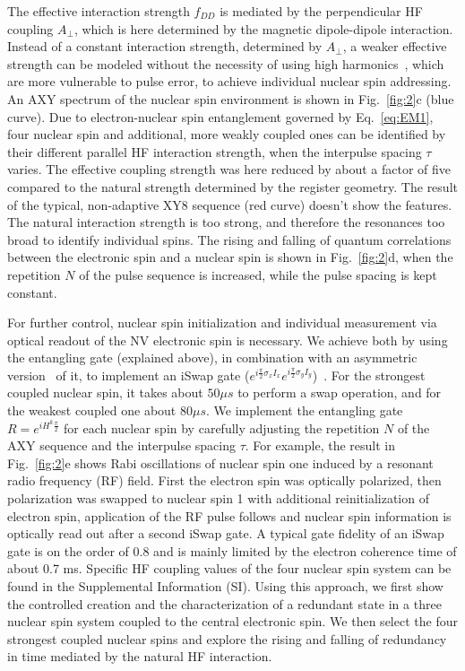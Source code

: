 \documentclass[aps,prl,floatfix,twocolumn,footinbib,superscriptaddress]{revtex4-1}
\begin{document}
The effective interaction strength $f_{DD}$ is mediated by the perpendicular HF coupling $A_\perp$, which is here determined by the magnetic dipole-dipole interaction. Instead of a constant interaction strength, determined by $A_\perp$, a weaker effective strength can be modeled without the necessity of using high harmonics~\cite{Childress281,Tam14}, which are more vulnerable to pulse error, to achieve individual nuclear spin addressing. An AXY spectrum of the nuclear spin environment is shown in Fig.~\ref{fig:2}c (blue curve). Due to electron-nuclear spin entanglement governed by Eq.~\eqref{eq:EM1}, four nuclear spin and additional, more weakly coupled ones can be identified by their different parallel HF interaction strength, when the interpulse spacing $\tau$ varies. The effective coupling strength was here reduced by about a factor of five compared to the natural strength determined by the register geometry. The result of the typical, non-adaptive XY8 sequence (red curve) doesn't show the features. The natural interaction strength is too strong, and therefore the resonances too broad to identify individual spins. The rising and falling of quantum correlations between the electronic spin and a nuclear spin is shown in Fig.~\ref{fig:2}d, when the repetition $N$ of the pulse sequence is increased, while the pulse spacing is kept constant.

For further control, nuclear spin initialization and individual measurement via optical readout of the NV electronic spin is necessary. We achieve both by using the entangling gate (explained above), in combination with an asymmetric version~\cite{Souza4748} of it, to implement an iSwap gate ($e^{i\frac{\pi}{2}\sigma_xI_x}e^{i\frac{\pi}{2}\sigma_yI_y}$)~\cite{Cas17}. For the strongest coupled nuclear spin, it takes about $50\mu s$ to perform a swap operation, and for the weakest coupled one about $80\mu s$. We implement the entangling gate $R=e^{iH^k\frac{\pi}{2}}$ for each nuclear spin by carefully adjusting the repetition $N$ of the AXY sequence and the interpulse spacing $\tau$. For example, the result in Fig.~\ref{fig:2}e shows Rabi oscillations of nuclear spin one induced by a resonant radio frequency (RF) field. First the electron spin was optically polarized, then polarization was swapped to nuclear spin 1 with additional reinitialization of electron spin, application of the RF pulse follows and nuclear spin information is optically read out after a second iSwap gate. A typical gate fidelity of an iSwap gate is on the order of $0.8$ and is mainly limited by the electron coherence time of about 0.7 ms. Specific HF coupling values of the four nuclear spin system can be found in the Supplemental Information (SI). Using this approach, we first show the controlled creation and the characterization of a redundant state in a three nuclear spin system coupled to the central electronic spin. We then select the four strongest coupled nuclear spins and explore the rising and falling of redundancy in time mediated by the natural HF interaction.
\end{document}
